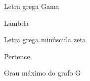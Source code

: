     \item[$\Gamma$]  Letra grega Gama
    \item[$\Lambda$] Lambda
    \item[$\zeta$]   Letra grega minúscula zeta
    \item[$\in$]     Pertence
    \item[$\Delta(G)$] Grau máximo do grafo G